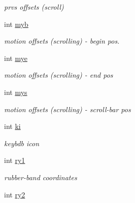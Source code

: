 \begin{CompactItemize}
\begin{CompactList}\small\item\em prvs offsets (scroll) \item\end{CompactList}\item 
\hypertarget{struct__icon__list_o20}{
int \hyperlink{struct__icon__list_o20}{myb}}
\label{struct__icon__list_o20}

\begin{CompactList}\small\item\em motion offsets (scrolling) - begin pos. \item\end{CompactList}\item 
\hypertarget{struct__icon__list_o22}{
int \hyperlink{struct__icon__list_o22}{mye}}
\label{struct__icon__list_o22}

\begin{CompactList}\small\item\em motion offsets (scrolling) - end pos \item\end{CompactList}\item 
\hypertarget{struct__icon__list_o24}{
int \hyperlink{struct__icon__list_o24}{mys}}
\label{struct__icon__list_o24}

\begin{CompactList}\small\item\em motion offsets (scrolling) - scroll-bar pos \item\end{CompactList}\item 
\hypertarget{struct__icon__list_o25}{
int \hyperlink{struct__icon__list_o25}{ki}}
\label{struct__icon__list_o25}

\begin{CompactList}\small\item\em keybdb icon \item\end{CompactList}\item 
\hypertarget{struct__icon__list_o27}{
int \hyperlink{struct__icon__list_o27}{ry1}}
\label{struct__icon__list_o27}

\begin{CompactList}\small\item\em rubber-band coordinates \item\end{CompactList}\item 
\hypertarget{struct__icon__list_o29}{
int \hyperlink{struct__icon__list_o29}{ry2}}
\label{struct__icon__list_o29}


\end{CompactItemize}
